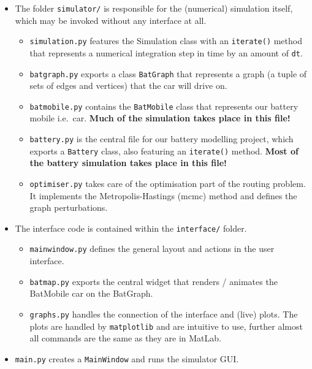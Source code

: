 \documentclass{prettytex/ox/mmsc-special-topic}
\begin{document}
  \begin{itemize}
    \tightlist
    \item
          The folder \texttt{simulator/} is responsible for the (numerical)
          simulation itself, which may be invoked without any interface at all.

          \begin{itemize}
            \tightlist
            \item
                  \texttt{simulation.py} features the Simulation class with an
                  \texttt{iterate()} method that represents a numerical integration
                  step in time by an amount of \texttt{dt}.
            \item
                  \texttt{batgraph.py} exports a class \texttt{BatGraph} that
                  represents a graph (a tuple of sets of edges and vertices) that the
                  car will drive on.
            \item
                  \texttt{batmobile.py} contains the \texttt{BatMobile} class that
                  represents our battery mobile i.e.~car. \textbf{Much of the
                    simulation takes place in this file!}
            \item
                  \texttt{battery.py} is the central file for our battery modelling
                  project, which exports a \texttt{Battery} class, also featuring an
                  \texttt{iterate()} method. \textbf{Most of the battery simulation
                    takes place in this file!}
            \item
                  \texttt{optimiser.py} takes care of the optimisation part of the routing problem. It implements the Metropolis-Hastings (\gls{mcmc}) method and defines the graph perturbations.
          \end{itemize}
    \item
          The interface code is contained within the \texttt{interface/} folder.

          \begin{itemize}
            \tightlist
            \item
                  \texttt{mainwindow.py} defines the general layout and actions in the
                  user interface.
            \item
                  \texttt{batmap.py} exports the central widget that renders /
                  animates the BatMobile car on the BatGraph.
            \item
                  \texttt{graphs.py} handles the connection of the interface and (live) plots. The plots are handled by \texttt{matplotlib} and are intuitive to use, further almost all commands are the same as they are in MatLab.
          \end{itemize}
    \item
          \texttt{main.py} creates a \texttt{MainWindow} and runs the simulator
          GUI.
  \end{itemize}
\end{document}
